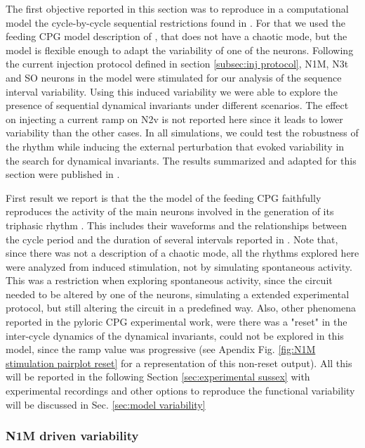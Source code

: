 The first objective reported in this section was to reproduce in a computational model the cycle-by-cycle sequential restrictions found in \cite{elices_robust_2019}. For that we used the feeding CPG model description of \cite{vavoulis_dynamic_2007}, that does not have a chaotic mode, but the model is flexible enough to adapt the variability of one of the neurons. Following the current injection protocol defined in section \ref{subsec:inj protocol}, N1M, N3t and SO neurons in the model were stimulated for our analysis of the sequence interval variability. Using this induced variability we were able to explore the presence of sequential dynamical invariants under different scenarios. The effect on injecting a current ramp on N2v is not reported here since it leads to lower variability than the other cases. In all simulations, we could test the robustness of the rhythm while inducing the external perturbation that evoked variability in the search for dynamical invariants. The results summarized and adapted for this section were published in \cite{garrido-pena_characterization_2021}.

First result we report is that the the model of the feeding CPG faithfully reproduces the activity of the main neurons involved in the generation of its triphasic rhythm \parencite{vavoulis_dynamical_2007}. This includes their waveforms and the relationships between the cycle period and the duration of several intervals reported in \parencite{elliott_temporal_1991}. Note that, since there was not a description of a chaotic mode, all the rhythms explored here were analyzed from induced stimulation, not by simulating spontaneous activity. This was a restriction when exploring spontaneous activity, since the circuit needed to be altered by one of the neurons, simulating a extended experimental protocol, but still altering the circuit in a predefined way. Also, other phenomena reported in the pyloric CPG experimental work, were there was a "reset" in the inter-cycle dynamics of the dynamical invariants, could not be explored in this model, since the ramp value was progressive (see Apendix Fig. \ref{fig:N1M stimulation pairplot reset} for a representation of this non-reset output). All this will be reported in the following Section \ref{sec:experimental sussex} with experimental recordings and other options to reproduce the functional variability will be discussed in Sec. \ref{sec:model variability}

\subsubsection{N1M driven variability}
\label{subsec:n1m driven}

